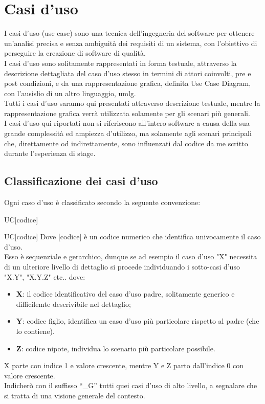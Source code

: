 \section{Casi d'uso}
I casi d'uso (use case) sono una tecnica dell'ingegneria del software per ottenere un'analisi precisa e senza ambiguità dei requisiti di un sistema, con l'obiettivo di perseguire la creazione di software di qualità.\\
I casi d'uso sono solitamente rappresentati in forma testuale, attraverso la descrizione dettagliata del caso d'uso stesso in termini di attori coinvolti, pre e post condizioni, e da una rappresentazione grafica, definita Use Case Diagram, con l'ausislio di un altro linguaggio, \gls{umlg}.\\
Tutti i casi d'uso saranno qui presentati attraverso descrizione testuale, mentre la rappresentazione grafica verrà utilizzata solamente per gli scenari più generali.\\
I casi d'uso qui riportati non si riferiscono all'intero software a causa della sua grande complessità ed ampiezza d'utilizzo, ma solamente agli scenari principali che, direttamente od indirettamente, sono influenzati dal codice da me scritto durante l'esperienza di stage.\\
\subsection{Classificazione dei casi d'uso}
Ogni caso d’uso è classificato secondo la seguente convenzione:
\begin{center}
	UC[codice]
\end{center}
UC[codice]
Dove [codice] è un codice numerico che identifica univocamente il caso d’uso.\\
Esso è sequenziale e gerarchico, dunque se ad esempio il caso d’uso "X" necessita di un ulteriore livello di dettaglio si procede individuando i sotto-casi d’uso "X.Y", "X.Y.Z" etc.. dove:\\
\begin{itemize}
	\item \textbf{X}: il codice identificativo del caso d'uso padre, solitamente generico e difficilemte descrivibile nel dettaglio; 
	\item \textbf{Y}: codice figlio, identifica un caso d'uso più particolare rispetto al padre (che lo contiene).
	\item \textbf{Z}: codice nipote, individua lo scenario più particolare possibile.
	
\end{itemize}
X parte con indice 1 e valore crescente, mentre Y e Z parto dall'indice 0 con valore crescente.\\
Indicherò con il suffisso “\_G” tutti quei casi d’uso di alto livello, a segnalare che si tratta di una visione generale del contesto.
